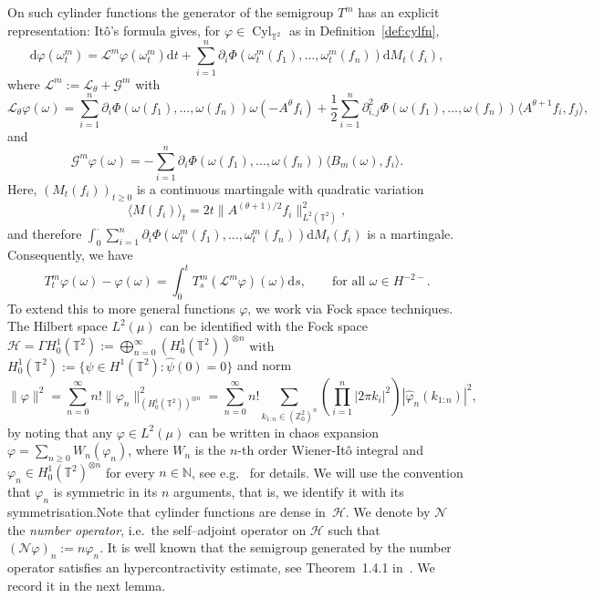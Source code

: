 \documentclass[10pt]{article}
\newcommand{\assign}{:=}
\newcommand{\mathd}{\mathrm{d}}
\newcommand{\tmop}[1]{\ensuremath{\operatorname{#1}}}
\newcommand{\tmtextit}[1]{{\itshape{#1}}}
\begin{document}
On such cylinder functions the generator of the semigroup $T^m$ has an
explicit representation: It{\^o}'s formula gives, for $\varphi \in
\tmop{Cyl}_{\mathbb{T}^2}$ as in Definition~\ref{def:cylfn},
\begin{equation}
  \mathd \varphi (\omega_t^m) =\mathcal{L}^m \varphi (\omega^m_t) \mathd t +
  \sum_{i = 1}^n \partial_i \Phi (\omega_t^m (f_1), \ldots, \omega_t^m (f_n))
  \mathd M_t (f_i), \label{eq:ito-cyl}
\end{equation}
where $\mathcal{L}^m \assign \mathcal{L}_{\theta} +\mathcal{G}^m$ with
\[ \mathcal{L}_{\theta} \varphi (\omega) = \sum_{i = 1}^n \partial_i \Phi
   (\omega (f_1), \ldots, \omega (f_n)) \omega (- A^{\theta} f_i) +
   \frac{1}{2} \sum_{i = 1}^n \partial_{i, j}^2 \Phi (\omega (f_1), \ldots,
   \omega (f_n)) \langle A^{\theta + 1} f_i, f_j \rangle, \]
and
\[ \mathcal{G}^m \varphi (\omega) = - \sum_{i = 1}^n \partial_i \Phi (\omega
   (f_1), \ldots, \omega (f_n)) \langle B_m (\omega), f_i \rangle . \]
Here, $(M_t (f_i))_{t \geqslant 0}$ is a continuous martingale with quadratic
variation
\[ \langle M (f_i) \rangle_t = 2 t \| A^{(\theta + 1) / 2} f_i \|_{L^2
   (\mathbb{T}^2)}^2, \]
and therefore $\int_0^{\cdot} \sum_{i = 1}^n \partial_i \Phi (\omega_t^m
(f_1), \ldots, \omega_t^m (f_n)) \mathd M_t (f_i)$ is a martingale.
Consequently, we have
\[ T^m_t \varphi (\omega) - \varphi (\omega) = \int_0^t T^m_s (\mathcal{L}^m
   \varphi) (\omega) \mathd s, \qquad \text{for all } \omega \in H^{- 2 -} .
\]
To extend this to more general functions $\varphi$, we work via Fock space
techniques. The Hilbert space $L^2 (\mu)$ can be identified with the Fock
space $\mathcal{H}= \Gamma H^1_0 (\mathbb{T}^2) \assign \bigoplus_{n =
0}^{\infty} (H^1_0 (\mathbb{T}^2))^{\otimes n}$ with $H^1_0 (\mathbb{T}^2)
\assign \{ \psi \in H^1 (\mathbb{T}^2) : \hat{\psi} (0) = 0 \}$ and norm
\[ \| \varphi \|^2 = \sum_{n = 0}^{\infty} n! \| \varphi_n \|^2_{(H^1_0
   (\mathbb{T}^2))^{\otimes n}} = \sum_{n = 0}^{\infty} n! \sum_{k_{1 : n} \in
   (\mathbb{Z}^2_0)^n} \left( \prod_{i = 1}^n | 2 \pi k_i |^2  \right)  |
   \hat{\varphi}_n (k_{1 : n}) |^2, \]
by noting that any $\varphi \in L^2 (\mu)$ can be written in chaos expansion
$\varphi = \sum_{n \geq 0} W_n (\varphi_n)$, where $W_n$ is the $n$-th order
Wiener-It{\^o} integral and $\varphi_n \in H^1_0 (\mathbb{T}^2)^{\otimes n}$
for every $n \in \mathbb{N}$, see
e.g.~{\cite{janson1997gaussian,nualart2006malliavin}} for details. We will use
the convention that $\varphi_n$ is symmetric in its $n$ arguments, that is, we
identify it with its symmetrisation.\quad Note that cylinder functions are
dense in~$\mathcal{H}$. We denote by $\mathcal{N}$ the \tmtextit{number
operator}, i.e.~the self--adjoint operator on $\mathcal{H}$ such that
$(\mathcal{N} \varphi)_n \assign n \varphi_n$. It is well known that the
semigroup generated by the number operator satisfies an hypercontractivity
estimate, see Theorem~1.4.1 in~{\cite{nualart2006malliavin}}. We record it in
the next lemma.
\end{document}
